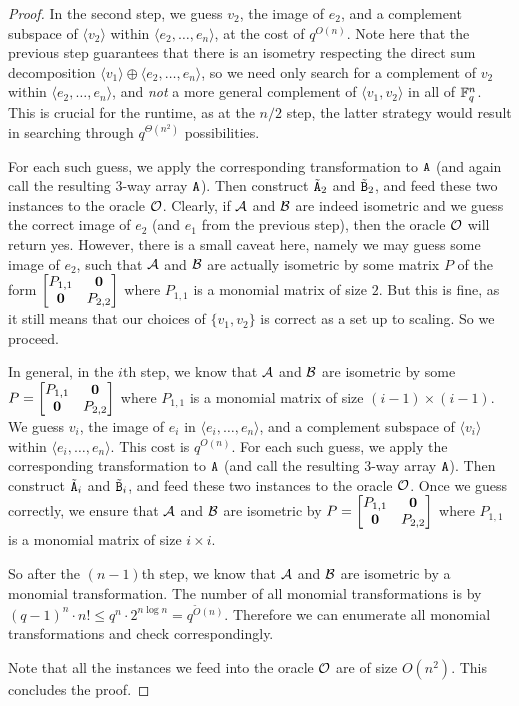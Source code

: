 \documentclass[11pt]{article}
\begin{document}
\begin{proof}
In the second step, we guess $v_2$, the image of $e_2$, and a complement subspace 
of $\langle v_2\rangle$ within $\langle e_2, \dots, e_n\rangle$, at the cost of 
$q^{O(n)}$. 
Note here that the previous step guarantees that there is an isometry respecting 
the direct sum decomposition $\langle v_1 \rangle \oplus \langle e_2, \dotsc, e_n 
\rangle$, so we need only search for a complement of $v_2$ within $\langle e_2, 
\dotsc, e_n \rangle$, and \emph{not} a more general complement of $\langle v_1, 
v_2 \rangle$ in all of $\mathbb{F}_q^n$. This is crucial for the runtime, as at the $n/2$ 
step, the latter strategy would result in searching through $q^{\Theta(n^2)}$ 
possibilities.

For each such guess, we apply the corresponding transformation to 
$\mathtt{A}$ (and again call the resulting $3$-way array $\mathtt{A}$). Then construct 
$\tilde{\mathtt{A}}_2$ 
and $\tilde{\mathtt{B}}_2$, and feed these two instances to the oracle $\mathcal{O}$. Clearly, 
if $\mathcal{A}$ and $\mathcal{B}$ are indeed isometric and we guess the correct image of $e_2$ 
(and $e_1$ from the previous step), 
then the oracle $\mathcal{O}$ will return yes. However, there is a small caveat here, 
namely we may guess some image of $e_2$, such that $\mathcal{A}$ and $\mathcal{B}$ are actually 
isometric by some matrix $P$ of the form $\begin{bmatrix} P_{1,1} & \mathbf{0} \\ 
\mathbf{0} & P_{2,2} \end{bmatrix}$ where $P_{1,1}$ is a monomial matrix of size $2$. 
But this is fine, as it still means that our choices of $\{v_1, v_2\}$ is correct 
as a set up to scaling. So we proceed.

In general, in the $i$th step, we know that $\mathcal{A}$ and $\mathcal{B}$ are isometric by some 
$P=\begin{bmatrix} P_{1,1} & \mathbf{0} \\ \mathbf{0} & P_{2,2} \end{bmatrix}$ where 
$P_{1,1}$ is a monomial matrix of size $(i-1)\times (i-1)$. We guess $v_i$, the 
image of $e_i$ in $\langle e_i, \dots, e_n\rangle$, and a complement subspace of 
$\langle v_i\rangle$ within $\langle e_i, \dots, e_n\rangle$. 
This cost is 
$q^{O(n)}$. For each such guess, we apply the corresponding transformation to 
$\mathtt{A}$ (and call the resulting $3$-way array $\mathtt{A}$). Then construct 
$\tilde{\mathtt{A}}_i$ 
and $\tilde{\mathtt{B}}_i$, and feed these two instances to the oracle $\mathcal{O}$. Once we 
guess correctly, we ensure that $\mathcal{A}$ and $\mathcal{B}$ are isometric by 
$P=\begin{bmatrix} P_{1,1} & \mathbf{0} \\ \mathbf{0} & P_{2,2} \end{bmatrix}$ where 
$P_{1,1}$ is a monomial matrix of size $i\times i$.

So after the $(n-1)$th step, we know that $\mathcal{A}$ and $\mathcal{B}$ are isometric by a 
monomial transformation. The number of all monomial transformations is by $(q-1)^n\cdot n!\leq q^n\cdot 2^{n\log 
n}=q^{\tilde{O}(n)}$. Therefore we can enumerate all 
monomial transformations and check correspondingly. 

Note that all the instances we feed into the oracle $\mathcal{O}$ are of size 
$O(n^2)$. This concludes the proof. 
\end{proof}
\end{document}
